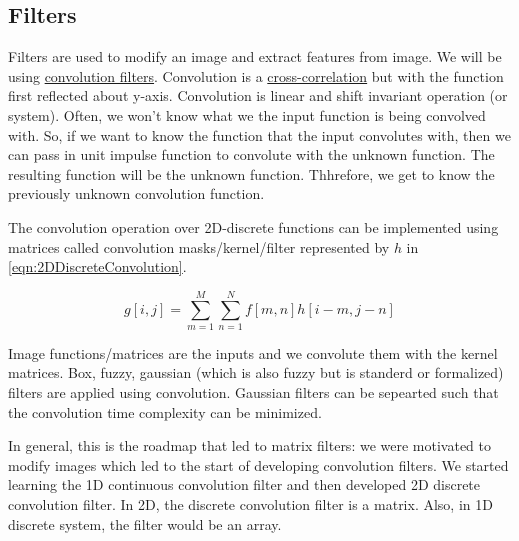 \documentclass[12pt]{report}%
\theoremstyle{definition}  %
\begin{document}
\subsection{Filters}
\hspace{\parindent}Filters are used to modify an image and extract features from image. We will be using \href{https://www.youtube.com/watch?v=ctn4MKATJOs&t=3s}{convolution filters}. Convolution is a \href{https://www.youtube.com/watch?v=Ma0YONjMZLI}{cross-correlation} but with the function first reflected about y-axis. Convolution is linear and shift invariant operation (or system). Often, we won't know what we the input function is being convolved with. So, if we want to know the function that the input convolutes with, then we can pass in unit impulse function to convolute with the unknown function. The resulting function will be the unknown function. Thhrefore, we get to know the previously unknown convolution function.

The convolution operation over 2D-discrete functions can be implemented using matrices called convolution masks/kernel/filter represented by $h$ in \ref{eqn:2DDiscreteConvolution}.

\begin{equation}
g[i,j]=\sum_{m=1} ^{M}\sum_{n=1} ^{N} f[m,n]h[i-m, j-n]
\label{eqn:2DDiscreteConvolution}
\end{equation}

Image functions/matrices are the inputs and we convolute them with the kernel matrices. Box, fuzzy, gaussian (which is also fuzzy but is standerd or formalized) filters are applied using convolution. Gaussian filters can be sepearted such that the convolution time complexity can be minimized.

In general, this is the roadmap that led to matrix filters: we were motivated to modify images which led to the start of developing convolution filters. We started learning the 1D continuous convolution filter and then developed 2D discrete convolution filter. In 2D, the discrete convolution filter is a matrix. Also, in 1D discrete system, the filter would be an array.

\end{document}
